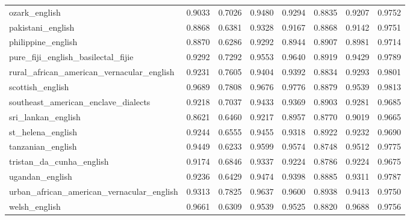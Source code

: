 \begin{landscape}
\begin{longtable}{lccccccc}
ozark\_english & 0.9033 & 0.7026 & 0.9480 & 0.9294 & 0.8835 & 0.9207 & 0.9752 \\
pakistani\_english & 0.8868 & 0.6381 & 0.9328 & 0.9167 & 0.8868 & 0.9142 & 0.9751 \\
philippine\_english & 0.8870 & 0.6286 & 0.9292 & 0.8944 & 0.8907 & 0.8981 & 0.9714 \\
pure\_fiji\_english\_basilectal\_fijie & 0.9292 & 0.7292 & 0.9553 & 0.9640 & 0.8919 & 0.9429 & 0.9789 \\
rural\_african\_american\_vernacular\_english & 0.9231 & 0.7605 & 0.9404 & 0.9392 & 0.8834 & 0.9293 & 0.9801 \\
scottish\_english & 0.9689 & 0.7808 & 0.9676 & 0.9776 & 0.8879 & 0.9539 & 0.9813 \\
southeast\_american\_enclave\_dialects & 0.9218 & 0.7037 & 0.9433 & 0.9369 & 0.8903 & 0.9281 & 0.9685 \\
sri\_lankan\_english & 0.8621 & 0.6460 & 0.9217 & 0.8957 & 0.8770 & 0.9019 & 0.9665 \\
st\_helena\_english & 0.9244 & 0.6555 & 0.9455 & 0.9318 & 0.8922 & 0.9232 & 0.9690 \\
tanzanian\_english & 0.9449 & 0.6233 & 0.9599 & 0.9574 & 0.8748 & 0.9512 & 0.9775 \\
tristan\_da\_cunha\_english & 0.9174 & 0.6846 & 0.9337 & 0.9224 & 0.8786 & 0.9224 & 0.9675 \\
ugandan\_english & 0.9236 & 0.6429 & 0.9474 & 0.9398 & 0.8885 & 0.9311 & 0.9787 \\
urban\_african\_american\_vernacular\_english & 0.9313 & 0.7825 & 0.9637 & 0.9600 & 0.8938 & 0.9413 & 0.9750 \\
welsh\_english & 0.9661 & 0.6309 & 0.9539 & 0.9525 & 0.8820 & 0.9688 & 0.9756 \\
\bottomrule
\end{longtable}
\end{landscape}